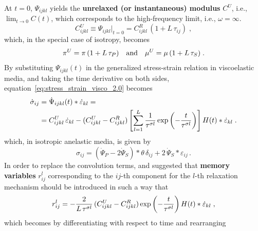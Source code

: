 At $t=0$, $\Psi_{ijkl}$ yields the \textbf{unrelaxed (or instantaneous) modulus} $C^U$, i.e., $\lim_{t\to0} C(t)$, which corresponds to the high-frequency limit, i.e., $\omega = \infty$.
\begin{equation}
    C_{ijkl}^U \equiv \Psi_{ijkl}\bigg|_{t=0} = C_{ijkl}^R\,(1+L\,\tau_{ij})\;,
\end{equation}
which, in the special case of isotropy, becomes
\begin{equation}
\allowdisplaybreaks
    \pi^U = \pi\,(1+L\,\tau_P)\quad\textrm{and}\quad\mu^U = \mu\,(1+L\,\tau_S)\;.
\end{equation}
By substituting $\Psi_{ijkl}(t)$ in the generalized stress-strain relation in viscoelastic media, and taking the time derivative on both sides, equation~\ref{eq:stress_strain_visco_2.0} becomes
\begin{equation}
\allowdisplaybreaks
    \begin{split}
    \dot{\sigma}_{ij} &= \dot{\Psi}_{ijkl}(t) \ast \dot{\varepsilon}_{kl} =\\ 
    &= C_{ijkl}^U\,\dot{\varepsilon}_{kl}-(C_{ijkl}^U-C_{ijkl}^R) \left[ \sum_{l=1}^{L}\frac{1}{\tau^{\sigma l}}\exp\left(-\frac{t}{\tau^{\sigma l}}\right) \right]H(t) \ast \dot{\varepsilon}_{kl}\;.
    \label{eq:stress_vti}
    \end{split}
\end{equation}
which, in isotropic anelastic media, is given by
\begin{equation}
    \sigma_{ij} = (\dot{\Psi}_P - 2\dot{\Psi}_S) \ast \theta\,\delta_{ij} + 2\,\dot{\Psi}_S \ast \varepsilon_{ij}\,.
    \label{eq:stress_iso_visco}
\end{equation}
In order to replace the convolution terms, \citet{Carcione:88} and \citet{robertsson:94} suggested that \textbf{memory variables} $r_{ij}^l$ corresponding to the $ij$-th component for the $l$-th relaxation mechanism should be introduced in such a way that
\begin{equation}
\allowdisplaybreaks
    r_{ij}^l = -\frac{2}{L\,\tau^{\sigma l}}\,(C_{ijkl}^U-C_{ijkl}^R)\exp\left(-\frac{t}{\tau^{\sigma l}}\right)H(t) \ast \dot{\varepsilon}_{kl}\;,
    \label{eq:r}
\end{equation}
which becomes by differentiating with respect to time and rearranging
